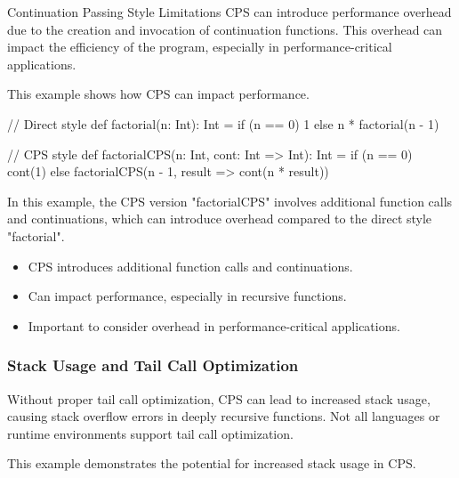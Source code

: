 \begin{notes}{Continuation Passing Style Limitations}
    CPS can introduce performance overhead due to the creation and invocation of continuation functions. This overhead can impact the efficiency of the program, especially in performance-critical applications.
    
    \begin{highlight}
    
        This example shows how CPS can impact performance.
    
    \begin{code}[Scala]
    // Direct style
    def factorial(n: Int): Int =
        if (n == 0) 1 else n * factorial(n - 1)
    
    // CPS style
    def factorialCPS(n: Int, cont: Int => Int): Int =
        if (n == 0) cont(1)
        else factorialCPS(n - 1, result => cont(n * result))
    \end{code}
    
        In this example, the CPS version "factorialCPS" involves additional function calls and continuations, which can introduce overhead compared to the direct style "factorial".
    
        \begin{itemize}
            \item CPS introduces additional function calls and continuations.
            \item Can impact performance, especially in recursive functions.
            \item Important to consider overhead in performance-critical applications.
        \end{itemize}
    
    \end{highlight}
    
    \subsubsection*{Stack Usage and Tail Call Optimization}
    
    Without proper tail call optimization, CPS can lead to increased stack usage, causing stack overflow errors in deeply recursive functions. Not all languages or runtime environments support tail call optimization.
    
    \begin{highlight}
    
        This example demonstrates the potential for increased stack usage in CPS.
    

\end{highlight}
\end{notes}
